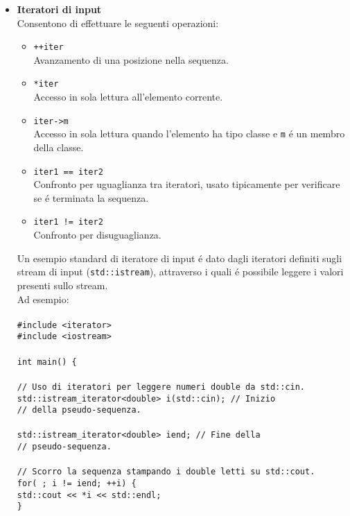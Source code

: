 \documentclass{article}
\newcommand\tab[1][1cm]{\hspace*{#1}}
\begin{document}
\begin{itemize}
\item \textbf{\textcolor{blu}{Iteratori di input}} \\ Consentono di effettuare le seguenti operazioni: \\
\begin{itemize}
\item \texttt{++iter}\\Avanzamento di una posizione nella sequenza.\\
\item \texttt{*iter}\\Accesso in sola lettura all'elemento corrente.\\
\item \texttt{iter->m}\\Accesso in sola lettura quando l'elemento ha tipo classe e \texttt{m} \'e un membro della classe.\\
\item \texttt{iter1 == iter2}\\Confronto per uguaglianza tra iteratori, usato tipicamente per verificare se \'e terminata la sequenza.\\
\item \texttt{iter1 != iter2}\\Confronto per disuguaglianza.\\
\end{itemize}
Un esempio standard di iteratore di input \'e dato dagli iteratori definiti sugli stream di input (\texttt{std::istream}), attraverso i quali \'e possibile leggere i valori presenti sullo stream. \\Ad esempio:\\ \\
\texttt{\#include <iterator> \\ \#include <iostream> \\ \\ int main() \{ \\ \\ \tab \textcolor{grigio}{// Uso di iteratori per leggere numeri double da std::cin.} \\ \tab std::istream\_iterator<double> i(std::cin); \textcolor{grigio}{// Inizio} \\ \tab \textcolor{grigio}{// della pseudo-sequenza.} \\ \\ \tab std::istream\_iterator<double> iend; \textcolor{grigio}{// Fine della\\ \tab // pseudo-sequenza. \\ \\ \tab // Scorro la sequenza stampando i double letti su std::cout.}\\ \tab for( ; i != iend; ++i) \{ \\ \tab \tab std::cout << *i << std::endl; \\ \} } \\ \\

\end{itemize}
\end{document}
